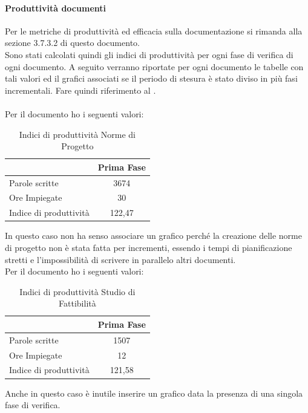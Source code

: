 					\paragraph{Produttività documenti}
						Per le metriche di produttività ed efficacia sulla documentazione si rimanda alla sezione 3.7.3.2 di questo documento.\\
						Sono stati calcolati quindi gli indici di produttività per ogni fase di verifica di ogni documento. A seguito verranno riportate per ogni documento le tabelle con tali valori ed il grafici associati se il periodo di stesura è stato diviso in più fasi incrementali. Fare quindi riferimento al .\\ \\
						Per il documento  ho i seguenti valori:				
						\begin{table}[H]\centering
							\begin{tabu}{| l | c |}
								\hline
													&Prima Fase   \\ \hline
												
								Parole scritte				& 3674	 \\ \hline
								Ore Impiegate				& 30	 \\ \hline\hline
							
								Indice di produttività 			 & 122,47 	 \\ \hline
							\end{tabu}
							\caption{Indici di produttività Norme di Progetto}
						\end{table}
						In questo caso non ha senso associare un grafico perché la creazione delle norme di progetto non è stata fatta per incrementi, essendo i tempi di pianificazione stretti e l'impossibilità di scrivere in parallelo altri documenti.\\
					
						Per il documento  ho i seguenti valori:			
						\begin{table}[H]\centering
							\begin{tabu}{| l | c |}
								\hline
													&Prima Fase   \\ \hline
													
								Parole scritte				& 1507	 \\ \hline
								Ore Impiegate				& 12	 \\ \hline\hline
								
								Indice di produttività 			 & 121,58	  \\ \hline
							\end{tabu}
							\caption{Indici di produttività Studio di Fattibilità}
						\end{table}
						Anche in questo caso è inutile inserire un grafico data la presenza di una singola fase di verifica.\\
					
